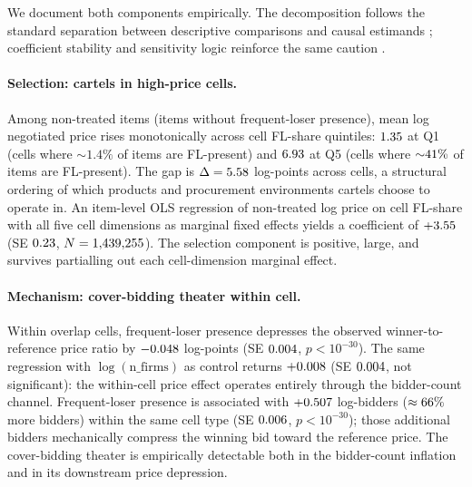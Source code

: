 We document both components empirically. The decomposition
follows the standard separation between descriptive comparisons
and causal estimands \citep{imbens2015causal}; coefficient
stability and sensitivity logic reinforce the same caution
\citep{oster2019unobservable,cinelli2020making}.

\paragraph{Selection: cartels in high-price cells.}
Among non-treated items (items without frequent-loser presence),
mean log negotiated price rises monotonically across cell
FL-share quintiles: $1.35$ at Q1 (cells where ${\sim}1.4\%$
of items are FL-present) and $6.93$ at Q5 (cells where
${\sim}41\%$ of items are FL-present). The gap is
$\Delta=5.58$ log-points across cells, a structural
ordering of which products and procurement environments cartels
choose to operate in. An item-level OLS regression of
non-treated log price on cell FL-share with all five cell
dimensions as marginal fixed effects yields a coefficient of
$+3.55$ (SE $0.23$, $N=1{,}439{,}255$).
The selection component is positive, large, and survives
partialling out each cell-dimension marginal effect.

\paragraph{Mechanism: cover-bidding theater within cell.}
Within overlap cells, frequent-loser presence depresses the
observed winner-to-reference price ratio by
$-0.048$ log-points (SE $0.004$,
$p<10^{-30}$). The same regression with
$\log(\text{n\_firms})$ as control returns
$+0.008$ (SE $0.004$,
not significant): the within-cell price effect operates entirely
through the bidder-count channel. Frequent-loser presence is
associated with $+0.507$ log-bidders ($\approx
66\%$ more bidders) within the same cell type
(SE $0.006$, $p<10^{-30}$); those additional bidders
mechanically compress the winning bid toward the reference
price. The cover-bidding theater is empirically detectable both
in the bidder-count inflation and in its downstream price
depression.

